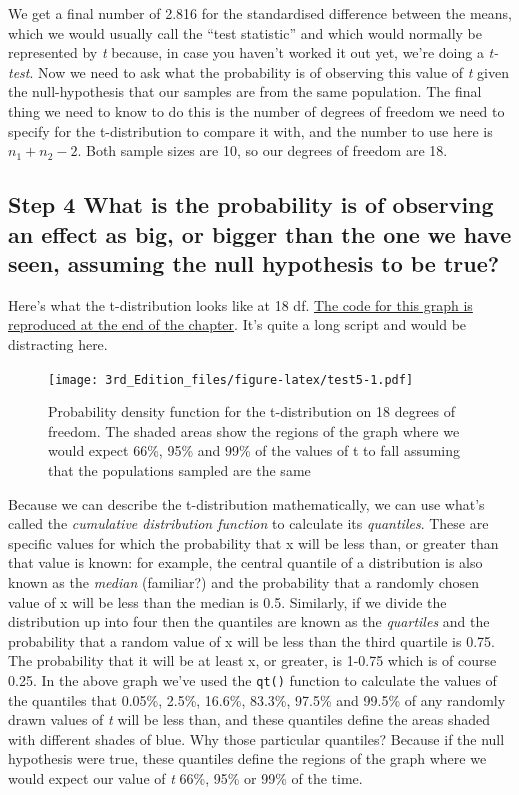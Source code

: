 \documentclass[
]{book}
\begin{document}
We get a final number of 2.816 for the standardised difference between the means, which we would usually call the ``test statistic'' and which would normally be represented by \emph{t} because, in case you haven't worked it out yet, we're doing a \emph{t-test}. Now we need to ask what the probability is of observing this value of \emph{t} given the null-hypothesis that our samples are from the same population. The final thing we need to know to do this is the number of degrees of freedom we need to specify for the t-distribution to compare it with, and the number to use here is \(n_1+n_2-2\). Both sample sizes are 10, so our degrees of freedom are 18.

\hypertarget{step-4-what-is-the-probability-is-of-observing-an-effect-as-big-or-bigger-than-the-one-we-have-seen-assuming-the-null-hypothesis-to-be-true}{%
\subsection{Step 4 What is the probability is of observing an effect as big, or bigger than the one we have seen, assuming the null hypothesis to be true?}\label{step-4-what-is-the-probability-is-of-observing-an-effect-as-big-or-bigger-than-the-one-we-have-seen-assuming-the-null-hypothesis-to-be-true}}

Here's what the t-distribution looks like at 18 df. \protect\hyperlink{Fig_5_code}{The code for this graph is reproduced at the end of the chapter}. It's quite a long script and would be distracting here.

\begin{figure}
\centering
\texttt{[image: 3rd\_Edition\_files/figure-latex/test5-1.pdf]}
\caption{\label{fig:test5}Probability density function for the t-distribution on 18 degrees of freedom. The shaded areas show the regions of the graph where we would expect 66\%, 95\% and 99\% of the values of t to fall assuming that the populations sampled are the same}
\end{figure}

Because we can describe the t-distribution mathematically, we can use what's called the \emph{cumulative distribution function} to calculate its \emph{quantiles}. These are specific values for which the probability that x will be less than, or greater than that value is known: for example, the central quantile of a distribution is also known as the \emph{median} (familiar?) and the probability that a randomly chosen value of x will be less than the median is 0.5. Similarly, if we divide the distribution up into four then the quantiles are known as the \emph{quartiles} and the probability that a random value of x will be less than the third quartile is 0.75. The probability that it will be at least x, or greater, is 1-0.75 which is of course 0.25. In the above graph we've used the \texttt{qt()} function to calculate the values of the quantiles that 0.05\%, 2.5\%, 16.6\%, 83.3\%, 97.5\% and 99.5\% of any randomly drawn values of \emph{t} will be less than, and these quantiles define the areas shaded with different shades of blue. Why those particular quantiles? Because if the null hypothesis were true, these quantiles define the regions of the graph where we would expect our value of \emph{t} 66\%, 95\% or 99\% of the time.
\end{document}
